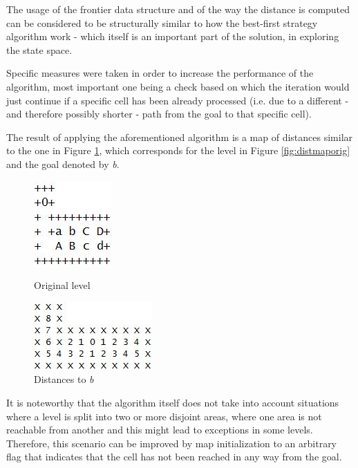 \documentclass[letterpaper]{article}
\begin{document}
The usage of the frontier data structure and of the way the distance is computed can be considered to be structurally similar to how the best-first strategy algorithm work - which itself is an important part of the solution, in exploring the state space.

Specific measures were taken in order to increase the performance of the algorithm, most important one being a check based on which the iteration would just continue if a specific cell has been already processed (i.e. due to a different - and therefore possibly shorter - path from the goal to that specific cell).

The result of applying the aforementioned algorithm is a map of distances similar to the one in Figure \ref{fig:distmapb}, which corresponds for the level in Figure \ref{fig:distmaporig} and the goal denoted by \textit{b}.

\begin{figure}[!htb]
\centering
\begin{minipage}[b]{0.45\linewidth}
	\centering
	\includegraphics[scale=0.4]{distmap_orig.JPG}
	\caption{Original level}
	\label{fig:distmaporig}
\end{minipage}
\quad
\begin{minipage}[b]{0.45\linewidth}
	\centering
	\includegraphics[scale=0.5]{distmap_b.JPG}
	\caption{Distances to \textit{b}}
	\label{fig:distmapb}
\end{minipage}
\end{figure}

It is noteworthy that the algorithm itself does not take into account situations where a level is split into two or more disjoint areas, where one area is not reachable from another and this might lead to exceptions in some levels. Therefore, this scenario can be improved by map initialization to an arbitrary flag that indicates that the cell has not been reached in any way from the goal.
\end{document}
